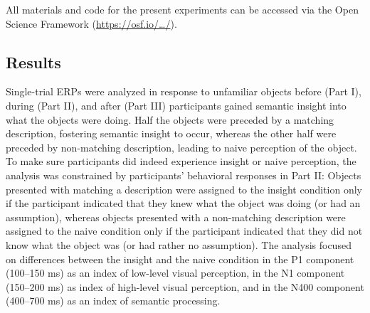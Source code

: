 \documentclass[
  english,
  man,11pt,floatsintext]{apa7}
\begin{document}
All materials and code for the present experiments can be accessed via the Open Science Framework (\href{https://osf.io/myprojects/}{https://osf.io/\ldots/}).

\hypertarget{results}{%
\subsection{Results}\label{results}}

Single-trial ERPs were analyzed in response to unfamiliar objects before (Part I), during (Part II), and after (Part III) participants gained semantic insight into what the objects were doing. Half the objects were preceded by a matching description, fostering semantic insight to occur, whereas the other half were preceded by non-matching description, leading to naive perception of the object. To make sure participants did indeed experience insight or naive perception, the analysis was constrained by participants' behavioral responses in Part II: Objects presented with matching a description were assigned to the insight condition only if the participant indicated that they knew what the object was doing (or had an assumption), whereas objects presented with a non-matching description were assigned to the naive condition only if the participant indicated that they did not know what the object was (or had rather no assumption). The analysis focused on differences between the insight and the naive condition in the P1 component (100--150 ms) as an index of low-level visual perception, in the N1 component (150--200 ms) as index of high-level visual perception, and in the N400 component (400--700 ms) as an index of semantic processing.
\end{document}
